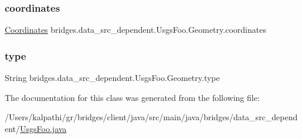 \subsubsection{\texorpdfstring{coordinates}{coordinates}}
{\footnotesize\ttfamily \mbox{\hyperlink{classbridges_1_1data__src__dependent_1_1_usgs_foo_1_1_geometry_1_1_coordinates}{Coordinates}} bridges.\+data\+\_\+src\+\_\+dependent.\+Usgs\+Foo.\+Geometry.\+coordinates}

\mbox{\label{classbridges_1_1data__src__dependent_1_1_usgs_foo_1_1_geometry_a985b3a46dad2fcd4e798d2f51198bcfd}} 
\subsubsection{\texorpdfstring{type}{type}}
{\footnotesize\ttfamily String bridges.\+data\+\_\+src\+\_\+dependent.\+Usgs\+Foo.\+Geometry.\+type}



The documentation for this class was generated from the following file\+:\begin{DoxyCompactItemize}
\item 
/\+Users/kalpathi/gr/bridges/client/java/src/main/java/bridges/data\+\_\+src\+\_\+dependent/\mbox{\hyperlink{_usgs_foo_8java}{Usgs\+Foo.\+java}}\end{DoxyCompactItemize}
